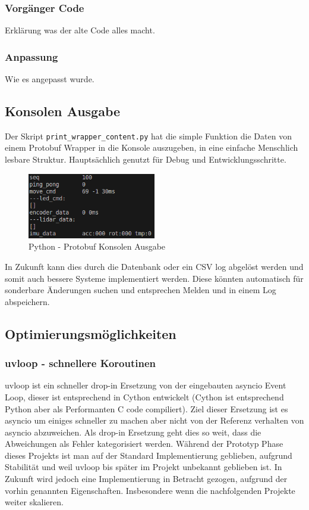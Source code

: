 \subsubsection{Vorgänger Code}
Erklärung was der alte Code alles macht.
\subsubsection{Anpassung}
Wie es angepasst wurde.

\subsection{Konsolen Ausgabe}
Der Skript \texttt{print\_wrapper\_content.py} hat die simple Funktion 
die Daten von einem Protobuf Wrapper in die Konsole auszugeben, 
in eine einfache Menschlich lesbare Struktur. 
Hauptsächlich genutzt für Debug und Entwicklungsschritte.

\begin{figure}[H]
    \includegraphics[width=0.5\textwidth, center]{img/Backend/print_wrapper_all.png}
    \caption{Python - Protobuf Konsolen Ausgabe}
    \label{fig:py_konsole_o}
\end{figure}

In Zukunft kann dies durch die Datenbank oder ein CSV log abgelöst werden 
und somit auch bessere Systeme implementiert werden.
% 
Diese könnten automatisch für sonderbare Änderungen suchen 
und entsprechen Melden und in einem Log abspeichern.

\subsection{Optimierungsmöglichkeiten}
\label{subsec:Optimierungsmöglichkeiten}
\subsubsection{uvloop - schnellere Koroutinen}
uvloop ist ein schneller drop-in Ersetzung von der eingebauten asyncio Event Loop, 
dieser ist entsprechend in Cython entwickelt 
(Cython ist entsprechend Python aber als Performanten C code compiliert).
Ziel dieser Ersetzung ist es asyncio um einiges schneller zu machen 
aber nicht von der Referenz verhalten von asyncio abzuweichen. 
Als drop-in Ersetzung geht dies so weit, 
dass die Abweichungen als Fehler kategorisiert werden.
% 
Während der Prototyp Phase dieses Projekts 
ist man auf der Standard Implementierung geblieben, aufgrund Stabilität
und weil uvloop bis später im Projekt unbekannt geblieben ist.
In Zukunft wird jedoch eine Implementierung in Betracht gezogen,
aufgrund der vorhin genannten Eigenschaften.
% 
Insbesondere wenn die nachfolgenden Projekte weiter skalieren.

